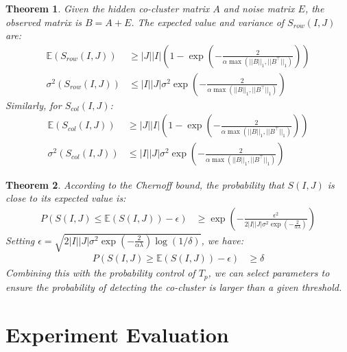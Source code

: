 \documentclass[journal]{IEEEtran}
\newtheorem{theorem}{Theorem}
\begin{document}
\begin{theorem}
  \label{thm:expected_score}
  Given the hidden co-cluster matrix $A$ and noise matrix $E$, the observed matrix is $B = A + E$. The expected value and variance of $S_{row}(I,J)$ are:
  \begin{align*}
    \mathbb{E}(S_{row}(I,J)) & \ge |J||I| \left(1 - \exp(-\frac{2}{\alpha \max(||B||_1, ||B^\top||_1)}) \right) \\
    \sigma^2(S_{row}(I,J))   & \le |I||J| \sigma^2 \exp(-\frac{2}{\alpha \max(||B||_1, ||B^\top||_1)})
  \end{align*}
  Similarly, for $S_{col}(I,J)$:
  \begin{align*}
    \mathbb{E}(S_{col}(I,J)) & \ge |J||I| \left(1 - \exp(-\frac{2}{\alpha \max(||B||_1, ||B^\top||_1)}) \right) \\
    \sigma^2(S_{col}(I,J))   & \le |I||J| \sigma^2 \exp(-\frac{2}{\alpha \max(||B||_1, ||B^\top||_1)})
  \end{align*}
\end{theorem}

\begin{theorem}
  \label{thm:chernoff_bound}
  According to the Chernoff bound, the probability that $S(I,J)$ is close to its expected value is:
  \begin{align*}
    P(S(I,J) \le \mathbb{E}(S(I,J)) - \epsilon)
     & \ge \exp(-\frac{\epsilon^2}{2|I||J| \sigma^2 \exp(-\frac{2}{\alpha \lambda})})
  \end{align*}
  Setting $\epsilon = \sqrt{2|I||J| \sigma^2 \exp(-\frac{2}{\alpha \lambda}) \log(1/\delta)}$, we have:
  \begin{align*}
    P(S(I,J) \ge \mathbb{E}(S(I,J)) - \epsilon) & \ge \delta
  \end{align*}
  Combining this with the probability control of $T_p$, we can select parameters to ensure the probability of detecting the co-cluster is larger than a given threshold.
\end{theorem}


\section{Experiment Evaluation}
\label{sec:experiment}
\end{document}
